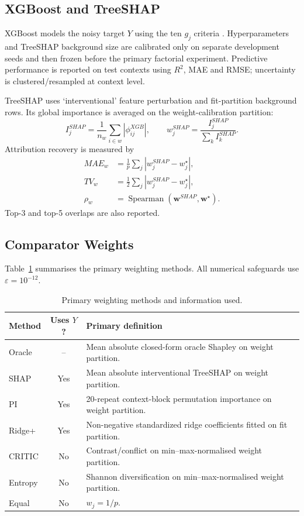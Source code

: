 \documentclass[runningheads]{llncs}
\newcommand{\eps}{\varepsilon}
\begin{document}
\subsection{XGBoost and TreeSHAP}

XGBoost models the noisy target $Y$ using the ten $g_j$ criteria \cite{chen2016xgboost}.
Hyperparameters and TreeSHAP background size are calibrated only on separate development seeds
and then frozen before the primary factorial experiment. Predictive performance is reported on
test contexts using $R^2$, MAE and RMSE; uncertainty is clustered/resampled at context level.

TreeSHAP uses `interventional' feature perturbation and fit-partition background rows. Its
global importance is averaged on the weight-calibration partition:
\begin{equation}
I_j^{SHAP}=\frac{1}{n_w}\sum_{i\in w}|\phi_{ij}^{XGB}|,
\qquad
w_j^{SHAP}=\frac{I_j^{SHAP}}{\sum_k I_k^{SHAP}}.
\label{eq:shapweights}
\end{equation}
Attribution recovery is measured by
\begin{align}
MAE_w&=\frac1p\sum_j|w_j^{SHAP}-w_j^\star|, \label{eq:maew}\\
TV_w&=\frac12\sum_j|w_j^{SHAP}-w_j^\star|, \label{eq:tvw}\\
\rho_w&=\operatorname{Spearman}(\mathbf w^{SHAP},\mathbf w^\star). \label{eq:spearmanw}
\end{align}
Top-3 and top-5 overlaps are also reported.

\subsection{Comparator Weights}

Table~\ref{tab:weightsmethods} summarises the primary weighting methods. All numerical safeguards
use $\eps=10^{-12}$.

\begin{table}[t]
\centering
\caption{Primary weighting methods and information used.}
\label{tab:weightsmethods}
\small
\begin{tabularx}{\linewidth}{@{}l c X@{}}
\toprule
\textbf{Method} & \textbf{Uses $Y$?} & \textbf{Primary definition}\\
\midrule
Oracle & -- & Mean absolute closed-form oracle Shapley on weight partition.\\
SHAP & Yes & Mean absolute interventional TreeSHAP on weight partition.\\
PI & Yes & 20-repeat context-block permutation importance on weight partition.\\
Ridge+ & Yes & Non-negative standardized ridge coefficients fitted on fit partition.\\
CRITIC & No & Contrast/conflict on min--max-normalised weight partition.\\
Entropy & No & Shannon diversification on min--max-normalised weight partition.\\
Equal & No & $w_j=1/p$.\\
\bottomrule
\end{tabularx}
\end{table}
\end{document}

